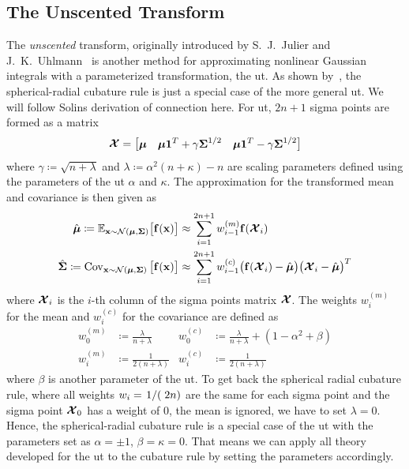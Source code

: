 	\subsection{The Unscented Transform}
		The \emph{unscented} transform, originally introduced by S.~J.~Julier and J.~K.~Uhlmann~\cite{julierNewApproachFiltering1995} is another method for approximating nonlinear Gaussian integrals with a parameterized transformation, the \ac{ut}. As shown by~\cite{solinCubatureIntegrationMethods2010}, the spherical-radial cubature rule is just a special case of the more general \ac{ut}. We will follow Solins derivation of connection here. For \ac{ut}, \( 2n + 1 \) sigma points are formed as a matrix
		\begin{equation}
			\boldsymbol{\mathrm{\mathcal{X}}} =
				\begin{bmatrix}
					\boldsymbol{\mathrm{\mu}} & \boldsymbol{\mathrm{\mu}} \boldsymbol{\mathrm{1}}^T + \gamma \boldsymbol{\mathrm{\Sigma}}^{1/2} & \boldsymbol{\mathrm{\mu}} \boldsymbol{\mathrm{1}}^T - \gamma \boldsymbol{\mathrm{\Sigma}}^{1/2}
				\end{bmatrix}  \label{eqn:utSigmaPoints}
		\end{equation}
		where \( \gamma \coloneqq \sqrt{n + \lambda} \) and \( \lambda \coloneqq \alpha^2 (n + \kappa) - n \) are scaling parameters defined using the parameters of the \ac{ut} \( \alpha \) and \( \kappa \). The approximation for the transformed mean and covariance is then given as
		\begin{align}
			\hat{\boldsymbol{\mathrm{\mu}}} \coloneqq \mathbb{E}_{\boldsymbol{\mathrm{x}} \sim \mathcal{N}(\boldsymbol{\mathrm{\mu}}, \boldsymbol{\mathrm{\Sigma}})}\big[ \boldsymbol{\mathrm{f}}(\boldsymbol{\mathrm{x}}) \big] &\approx \sum_{i = 1}^{2n + 1} w_{i - 1}^{(m)} \boldsymbol{\mathrm{f}}(\boldsymbol{\mathrm{\mathcal{X}}}_i)  \label{eqn:utMean} \\
			\hat{\boldsymbol{\mathrm{\Sigma}}} \coloneqq \operatorname{Cov}_{\boldsymbol{\mathrm{x}} \sim \mathcal{N}(\boldsymbol{\mathrm{\mu}}, \boldsymbol{\mathrm{\Sigma}})}\big[ \boldsymbol{\mathrm{f}}(\boldsymbol{\mathrm{x}}) \big] &\approx \sum_{i = 1}^{2n + 1} w_{i - 1}^{(c)} \big( \boldsymbol{\mathrm{f}}(\boldsymbol{\mathrm{\mathcal{X}}}_i) - \hat{\boldsymbol{\mathrm{\mu}}} \big) \big( \boldsymbol{\mathrm{\mathcal{X}}}_i - \hat{\boldsymbol{\mathrm{\mu}}} \big)^T  \label{eqn:utCov}
		\end{align}
		where \( \boldsymbol{\mathrm{\mathcal{X}}}_i \) is the \(i\)-th column of the sigma points matrix \( \boldsymbol{\mathrm{\mathcal{X}}} \). The weights \( w_i^{(m)} \) for the mean and \( w_i^{(c)} \) for the covariance are defined as
		\begin{align*}
			w_0^{(m)} &\coloneqq \frac{\lambda}{n + \lambda} & w_0^{(c)} &\coloneqq \frac{\lambda}{n + \lambda} + (1 - \alpha^2 + \beta) \\
			w_i^{(m)} &\coloneqq \frac{1}{2(n + \lambda)}    & w_i^{(c)} &\coloneqq \frac{1}{2(n + \lambda)}
		\end{align*}
		where \(\beta\) is another parameter of the \ac{ut}. To get back the spherical radial cubature rule, where all weights \( w_i = \flatfrac{1}(2n) \) are the same for each sigma point and the sigma point \( \boldsymbol{\mathrm{\mathcal{X}}}_0 \) has a weight of \(0\), \ie the mean is ignored, we have to set \( \lambda = 0 \). Hence, the spherical-radial cubature rule is a special case of the \ac{ut} with the parameters set as \( \alpha = \pm 1 \), \( \beta = \kappa = 0 \). That means we can apply all theory developed for the \ac{ut} to the cubature rule by setting the parameters accordingly.

